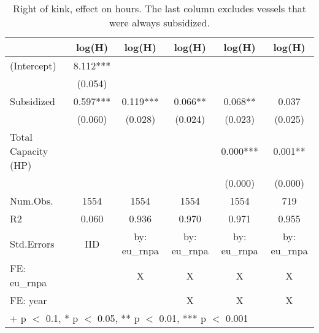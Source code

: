 \begin{table}

\caption{\label{tab:}Right of kink, effect on hours. The last column excludes vessels that were always subsidized.}
\centering
\begin{tabular}[t]{lccccc}
\toprule
  & log(H) & log(H)  & log(H)   & log(H)    & log(H)    \\
\midrule
(Intercept) & \num{8.112}*** &  &  &  & \\
 & (\num{0.054}) &  &  &  & \\
Subsidized & \num{0.597}*** & \num{0.119}*** & \num{0.066}** & \num{0.068}** & \num{0.037}\\
 & (\num{0.060}) & (\num{0.028}) & (\num{0.024}) & (\num{0.023}) & (\num{0.025})\\
Total Capacity (HP) &  &  &  & \num{0.000}*** & \num{0.001}**\\
 &  &  &  & (\num{0.000}) & (\num{0.000})\\
\midrule
Num.Obs. & \num{1554} & \num{1554} & \num{1554} & \num{1554} & \num{719}\\
R2 & \num{0.060} & \num{0.936} & \num{0.970} & \num{0.971} & \num{0.955}\\
Std.Errors & IID & by: eu\_rnpa & by: eu\_rnpa & by: eu\_rnpa & by: eu\_rnpa\\
FE: eu_rnpa &  & X & X & X & X\\
FE: year &  &  & X & X & X\\
\bottomrule
\multicolumn{6}{l}{\rule{0pt}{1em}+ p $<$ 0.1, * p $<$ 0.05, ** p $<$ 0.01, *** p $<$ 0.001}\\
\end{tabular}
\end{table}
